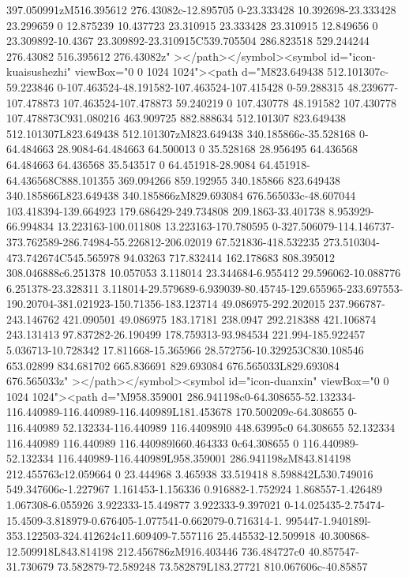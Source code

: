 {397.050991zM516.395612 276.43082c-12.895705 0-23.333428 10.392698-23.333428 23.299659 0 12.875239 10.437723 23.310915 23.333428
23.310915 12.849656 0 23.309892-10.4367 23.309892-23.310915C539.705504 286.823518 529.244244 276.43082 516.395612 276.43082z"
></path></symbol><symbol id="icon-kuaisushezhi" viewBox="0 0 1024 1024"><path d="M823.649438 512.101307c-59.223846
0-107.463524-48.191582-107.463524-107.415428 0-59.288315 48.239677-107.478873 107.463524-107.478873 59.240219 0 107.430778
48.191582 107.430778 107.478873C931.080216 463.909725 882.888634 512.101307 823.649438 512.101307L823.649438
512.101307zM823.649438 340.185866c-35.528168 0-64.484663 28.9084-64.484663 64.500013 0 35.528168 28.956495 64.436568 64.484663
64.436568 35.543517 0 64.451918-28.9084 64.451918-64.436568C888.101355 369.094266 859.192955 340.185866 823.649438
340.185866L823.649438 340.185866zM829.693084 676.565033c-48.607044 103.418394-139.664923 179.686429-249.734808 209.1863-33.401738
8.953929-66.994834 13.223163-100.011808 13.223163-170.780595 0-327.506079-114.146737-373.762589-286.74984-55.226812-206.02019
67.521836-418.532235 273.510304-473.742674C545.565978 94.03263 717.832414 162.178683 808.395012 308.046888c6.251378 10.057053
3.118014 23.344684-6.955412 29.596062-10.088776 6.251378-23.328311
3.118014-29.579689-6.939039-80.45745-129.655965-233.697553-190.20704-381.021923-150.71356-183.123714 49.086975-292.202015
237.966787-243.146762 421.090501 49.086975 183.17181 238.0947 292.218388 421.106874 243.131413 97.837282-26.190499
178.759313-93.984534 221.994-185.922457 5.036713-10.728342 17.811668-15.365966 28.572756-10.329253C830.108546 653.02899
834.681702 665.836691 829.693084 676.565033L829.693084 676.565033z"  ></path></symbol><symbol id="icon-duanxin" viewBox="0 0 1024
1024"><path d="M958.359001 286.941198c0-64.308655-52.132334-116.440989-116.440989-116.440989L181.453678 170.500209c-64.308655
0-116.440989 52.132334-116.440989 116.440989l0 448.63995c0 64.308655 52.132334 116.440989 116.440989 116.440989l660.464333
0c64.308655 0 116.440989-52.132334 116.440989-116.440989L958.359001 286.941198zM843.814198 212.455763c12.059664 0 23.444968
3.465938 33.519418 8.598842L530.749016 549.347606c-1.227967 1.161453-1.156336 0.916882-1.752924 1.868557-1.426489
1.067308-6.055926 3.922333-15.449877 3.922333-9.397021 0-14.025435-2.75474-15.4509-3.818979-0.676405-1.077541-0.662079-0.716314-1.
995447-1.940189l-353.122503-324.412624c11.609409-7.557116 25.445532-12.509918 40.300868-12.509918L843.814198
212.456786zM916.403446 736.484727c0 40.857547-31.730679 73.582879-72.589248 73.582879L183.27721 810.067606c-40.85857
}
